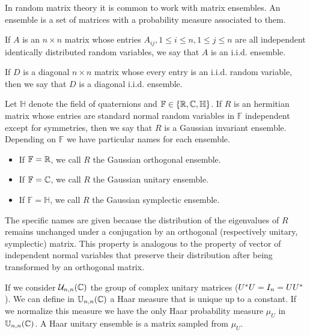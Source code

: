In random matrix theory it is common to work with matrix ensembles. An ensemble is a set of matrices with a probability measure associated to them.

\begin{example}
    If $A$ is an $n\times n$ matrix whose entries $A_{ij}, 1 \le i \le n, 1\le j \le n$ are all independent identically distributed random variables, we say that $A$ is an i.i.d. ensemble.
\end{example}

\begin{example}
    If $D$ is a diagonal $n\times n$ matrix whose every entry is an i.i.d. random variable, then we say that $D$ is a diagonal i.i.d. ensemble.
\end{example}

\begin{example}
    Let $\mathbb H$ denote the field of quaternions and $\mathbb F \in \{ \mathbb R, \mathbb C, \mathbb H \}$. If $R$ is an hermitian matrix whose entries are standard normal random variables in $\mathbb F$ independent except for symmetries, then we say that $R$ is a Gaussian invariant ensemble. Depending on $\mathbb F$ we have particular names for each ensemble.

    \begin{itemize}
        \item If $\mathbb F = \mathbb R$, we call $R$ the Gaussian orthogonal ensemble.
        \item If $\mathbb F = \mathbb C$, we call $R$ the Gaussian unitary ensemble.
        \item If $\mathbb F = \mathbb H$, we call $R$ the Gaussian symplectic ensemble.
    \end{itemize}

    The specific names are given because the distribution of the eigenvalues of $R$ remains unchanged under a conjugation by an orthogonal (respectively unitary, symplectic) matrix. This property is analogous to the property of vector of independent normal variables that preserve their distribution after being transformed by an orthogonal matrix.
\end{example}

\begin{example}
    If we consider $\mathcal U_{n,n}(\mathbb C)$ the group of complex unitary matrices ($U^*U = I_n = UU^*$). We can define in $\mathbb U_{n,n}(\mathbb C)$ a Haar measure that is unique up to a constant. If we normalize this measure we have the only Haar probability measure $\mu_U$ in $\mathbb U_{n,n}(\mathbb C)$. A Haar unitary ensemble is a matrix sampled from $\mu_U$.
\end{example}

